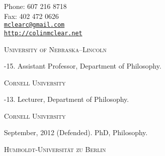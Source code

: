 \documentclass[11pt]{article}
\makeatletter
\def\myemail{mclearc@gmail.com}
\def\myweb{http://colinmclear.net}
\def\myphone{607 216 8718}
\def\myfax{402 472 0626}
\makeatother
\begin{document}
\begin{minipage}[t]{2.95in}
  
\end{minipage}
\hfill     
\hfill
\begin{minipage}[t]{1.7in}
  \flushright \footnotesize Phone: \myphone \\ 
  Fax: \myfax  \\ 
  {\footnotesize  \texttt{\href{mailto:\myemail}{\myemail}}} \\
  {\footnotesize \texttt{\href{\myweb}{\myweb}}}
\end{minipage}  


\medskip

\reversemarginpar

\medskip       

\medskip
{}

\noindent\textsc{University of Nebraska–Lincoln \vspace{0.01in}}

-15. Assistant Professor, Department of Philosophy.

\noindent\textsc{Cornell University \vspace{0.01in}}

-13. Lecturer, Department of Philosophy.      

\bigskip

\medskip

\noindent\textsc{Cornell University \vspace{0.01in}}

\ind September, 2012 (Defended). PhD, Philosophy.
\medskip

\noindent\textsc{Humboldt-Universität zu Berlin \vspace{0.01in}}
\end{document}
